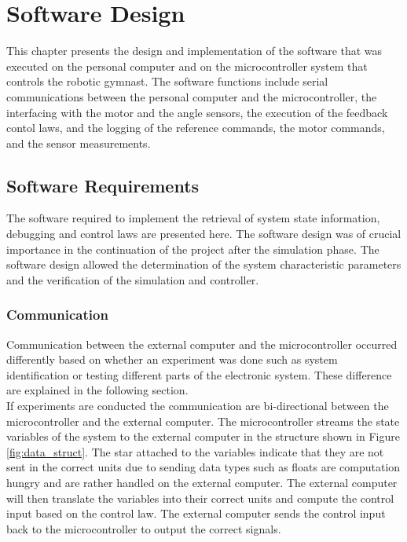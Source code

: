 \chapter{Software Design}
\label{chp:software_design}
This chapter presents the design and implementation of the software that was executed on the personal computer and on the microcontroller system that controls the robotic gymnast. The software functions include serial communications between the personal computer and the microcontroller, the interfacing with the motor and the angle sensors, the execution of the feedback contol laws, and the logging of the reference commands, the motor commands, and the sensor measurements.
\section{Software Requirements}
\label{sec:software_requirements}
The software required to implement the retrieval of system state information, debugging and control laws are presented here. The software design was of crucial importance in the continuation of the project after the simulation phase. The software design allowed the determination of the system characteristic parameters and the verification of the simulation and controller.

\subsection{Communication}

Communication between the external computer and the microcontroller occurred differently based on whether an experiment was done such as system identification or testing different parts of the electronic system. These difference are explained in the following section.\\

If experiments are conducted the communication are bi-directional between the microcontroller and the external computer. The microcontroller streams the state variables of the system to the external computer in the structure shown in Figure \ref{fig:data_struct}. The star attached to the variables indicate that they are not sent in the correct units due to sending data types such as floats are computation hungry and are rather handled on the external computer. The external computer will then translate the variables into their correct units and compute the control input based on the control law. The external computer sends the control input back to the microcontroller to output the correct signals.\\

